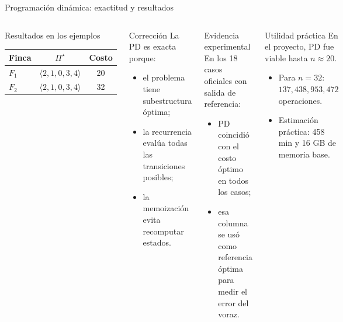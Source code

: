 \documentclass[aspectratio=169]{beamer}
\begin{document}
\begin{frame}{Programaci\'on din\'amica: exactitud y resultados}
  \begin{columns}[T,onlytextwidth]
    \scriptsize
    \begin{block}{Resultados en los ejemplos}
      \begin{tabular}{@{}lcc@{}}
        \toprule
        Finca & \(\Pi^\star\) & Costo \\
        \midrule
        \(F_1\) & \(\langle 2,1,0,3,4\rangle\) & 20 \\
        \(F_2\) & \(\langle 2,1,0,3,4\rangle\) & 32 \\
        \bottomrule
      \end{tabular}
    \end{block}

    \begin{block}{Correcci\'on}
      La PD es exacta porque:
      \begin{itemize}
        \item el problema tiene subestructura \'optima;
        \item la recurrencia eval\'ua todas las transiciones posibles;
        \item la memoizaci\'on evita recomputar estados.
      \end{itemize}
    \end{block}

    \scriptsize
    \begin{block}{Evidencia experimental}
      En los 18 casos oficiales con salida de referencia:
      \begin{itemize}
        \item PD coincidi\'o con el costo \'optimo en todos los casos;
        \item esa columna se us\'o como referencia \'optima para medir el error del voraz.
      \end{itemize}
    \end{block}

    \begin{alertblock}{Utilidad pr\'actica}
      En el proyecto, PD fue viable hasta \(n\approx 20\).
      \begin{itemize}
        \item Para \(n=32\): \(137{,}438{,}953{,}472\) operaciones.
        \item Estimaci\'on pr\'actica: 458 min y 16 GB de memoria base.
      \end{itemize}
    \end{alertblock}
  \end{columns}
\end{frame}
\end{document}
